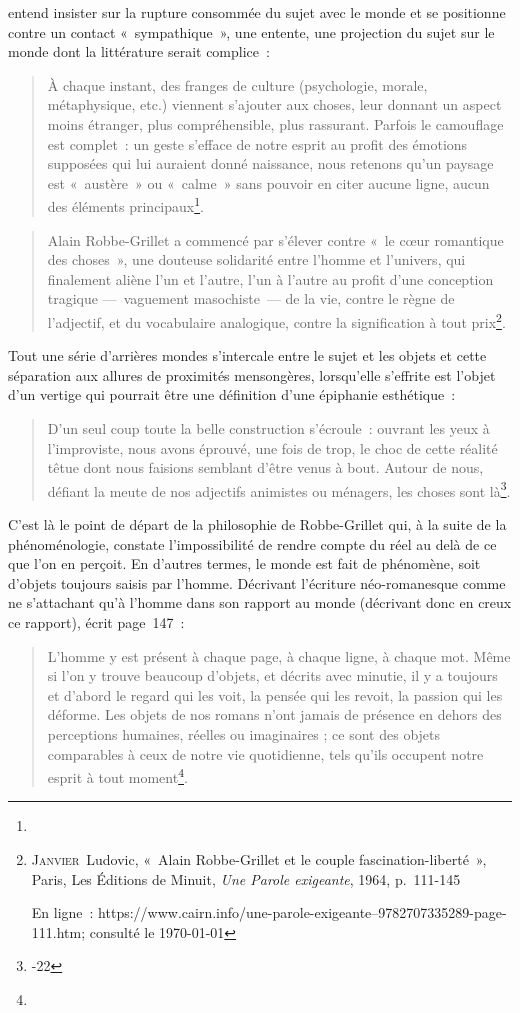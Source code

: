 \documentclass[12pt, a4paper]{article}
\begin{document}
\punr{} entend insister sur la rupture consommée du sujet avec le monde et se positionne contre un contact «~sympathique~», une entente, une projection du sujet sur le monde dont la littérature serait complice~:
\begin{quote}
    À chaque instant, des franges de culture (psychologie, morale, métaphysique, etc.) viennent s’ajouter aux choses, leur donnant un aspect moins étranger, plus compréhensible, plus rassurant. Parfois le camouflage est complet~: un geste s’efface de notre esprit au profit des émotions supposées qui lui auraient donné naissance, nous retenons qu’un paysage est «~austère~» ou «~calme~» sans pouvoir en citer aucune ligne, aucun des éléments principaux\footnote{}.
\end{quote}

\begin{quote}
    Alain Robbe-Grillet a commencé par s’élever contre «~le cœur romantique des choses~», une douteuse solidarité entre l’homme et l’univers, qui finalement aliène l’un et l’autre, l’un à l’autre au profit d’une conception tragique —~vaguement masochiste~— de la vie, contre le règne de l’adjectif, et du vocabulaire analogique, contre la signification à tout prix\footnote{\textsc{Janvier}~Ludovic, «~Alain Robbe-Grillet et le couple fascination-liberté~», Paris, Les Éditions de Minuit, \textit{Une Parole exigeante}, 1964, p.~111-145

En ligne~: https://www.cairn.info/une-parole-exigeante--9782707335289-page-111.htm; consulté le \today}.
\end{quote}

Tout une série d'arrières mondes s'intercale entre le sujet et les objets et cette séparation aux allures de proximités mensongères, lorsqu'elle s'effrite est l'objet d'un vertige qui pourrait être une définition d'une épiphanie esthétique~:
\begin{quote}
    D’un seul coup toute la belle construction s’écroule~: ouvrant les yeux à l’improviste, nous avons éprouvé, une fois de trop, le choc de cette réalité têtue dont nous faisions semblant d’être venus à bout. Autour de nous, défiant la meute de nos adjectifs animistes ou ménagers, les choses sont là\footnote{-22}. 
\end{quote}
C'est là le point de départ de la philosophie de Robbe-Grillet qui, à la suite de la phénoménologie, constate l'impossibilité de rendre compte du réel au delà de ce que l'on en perçoit. En d'autres termes, le monde est fait de phénomène, soit d'objets toujours saisis par l'homme. Décrivant l'écriture néo-romanesque comme ne s'attachant qu'à l'homme dans son rapport au monde (décrivant donc en creux ce rapport), \robbe{} écrit page~147~:
\begin{quote}
    L’homme y est présent à chaque page, à chaque ligne, à chaque mot. Même si l’on y trouve beaucoup d’objets, et décrits avec minutie, il y a toujours et d’abord le regard qui les voit, la pensée qui les revoit, la passion qui les déforme. Les objets de nos romans n’ont jamais de présence en dehors des perceptions humaines, réelles ou imaginaires ; ce sont des objets comparables à ceux de notre vie quotidienne, tels qu’ils occupent notre esprit à tout moment\footnote{}.
\end{quote}
\end{document}
